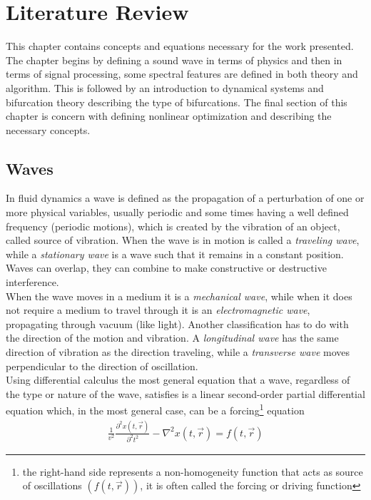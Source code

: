 \chapter{Literature Review}\label{chap_lit_review}

This chapter contains concepts and equations necessary for the work presented. The chapter begins by defining a sound wave in terms of physics and then in terms of signal processing, some spectral features are defined in both theory and algorithm. This is followed by an introduction to dynamical systems and bifurcation theory describing the type of bifurcations. The final section of this chapter is concern with defining nonlinear optimization and describing the necessary concepts.

\section{Waves}\label{subsec_waves}

In fluid dynamics a wave is defined as the propagation of a perturbation of one or more physical variables, usually periodic and some times having a well defined frequency (periodic motions), which is created by the vibration of an object, called source of vibration. When the wave is in motion is called a \textit{traveling wave}, while a \textit{stationary wave} is a wave such that it remains in a constant position. Waves can overlap, they can combine to make constructive or destructive interference.\\

When the wave moves in a medium it is a \textit{mechanical wave}, while when it does not require a medium to travel through it is an \textit{electromagnetic wave}, propagating through vacuum (like light). Another classification has to do with the direction of the motion and vibration. A \textit{longitudinal wave} has the same direction of vibration as the direction traveling, while a \textit{transverse wave} moves perpendicular to the direction of oscillation.\\


Using differential calculus the most general equation that a wave, regardless of the type or nature of the wave, satisfies is a linear second-order partial differential equation
which, in the most general case, can be  a forcing\footnote{the right-hand side represents a non-homogeneity function that acts as source of oscillations $(f(t,\vec{r}))$, it is often called the forcing or driving function} equation
\begin{gather}\label{general_wave_equation}
    \frac{1}{v^2}\frac{\partial^2x(t,\vec{r})}{\partial^2 t^2} -  \nabla^2 x(t,\vec{r})  = f(t,\vec{r})
\end{gather}


